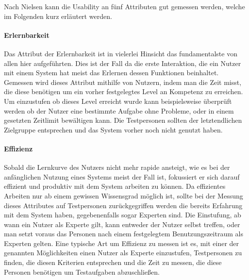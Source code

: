 Nach Nielsen kann die Usability an fünf Attributen gut gemessen werden, welche im Folgenden kurz erläutert werden\cite{Nielsen.1995?}.

\paragraph{Erlernbarkeit}
Das Attribut der Erlernbarkeit ist in vielerlei Hinsicht das fundamentalste von allen hier aufgeführten.
Dies ist der Fall da die erste Interaktion, die ein Nutzer mit einem System hat meist das Erlernen dessen Funktionen beinhaltet.
Gemessen wird dieses Attribut mithilfe von Nutzern, indem man die Zeit misst, die diese benötigen um ein vorher festgelegtes Level an Kompetenz zu erreichen.
Um einzustufen ob dieses Level erreicht wurde kann beispielsweise überprüft werden ob der Nutzer eine bestimmte Aufgabe ohne Probleme, oder in einem gesetzten Zeitlimit bewältigen kann.
Die Testpersonen sollten der letztendlichen Zielgruppe entsprechen und das System vorher noch nicht genutzt haben.

\paragraph{Effizienz}
Sobald die Lernkurve des Nutzers nicht mehr rapide ansteigt, wie es bei der anfänglichen Nutzung eines Systems meist der Fall ist, fokussiert er sich darauf effizient  und produktiv mit dem System arbeiten zu können.
Da effizientes Arbeiten nur ab einem gewissen Wissensgrad möglich ist, sollte bei der Messung dieses Attributes auf Testpersonen zurückgegriffen werden die bereits Erfahrung mit dem System haben, gegebenenfalls sogar Experten sind.
Die Einstufung, ab wann ein Nutzer als Experte gilt, kann entweder der Nutzer selbst treffen, oder man setzt voraus das Personen nach einem festgelegtem Benutzungszeitraum als Experten gelten.
Eine typische Art um Effizienz zu messen ist es, mit einer der genannten Möglichkeiten einen Nutzer als Experte einzustufen, Testpersonen zu finden, die diesen Kriterien entsprechen und die Zeit zu messen, die diese Personen benötigen um Testaufgaben abzuschließen.

